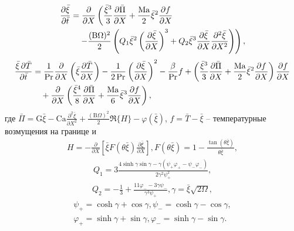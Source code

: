\documentclass[12pt,a4paper]{article}
\begin{document}
\begin{align} \label{eq:avrged_Ma_first_thermal}
	\frac{\partial \bar{\xi}}{\partial \bar{t}}
	&= \frac{\partial}{\partial X} \left(
	\frac{\bar{\xi}^3}{3} \frac{\partial \bar{\Pi}}{\partial X}
	+ \frac{\text{Ma}}{2} \bar{\xi}^2 \frac{\partial f}{\partial X} \right. \notag \\
	&\quad \left. - \frac{(\mathrm{B} \Omega)^2}{2} \left(
	Q_1 \bar{\xi}^2 \left( \frac{\partial \bar{\xi}}{\partial X} \right)^3
	+ Q_2 \bar{\xi}^3 \frac{\partial \bar{\xi}}{\partial X} \frac{\partial^2 \bar{\xi}}{\partial X^2}
	\right)
	\right),
\end{align}
\begin{align} \label{eq:avrged_Ma_second_thermal}
	\frac{\bar{\xi} \, \partial \bar{T}}{\partial \bar{t}}
	&= \frac{1}{\text{Pr}} \frac{\partial}{\partial X} \left( \bar{\xi} \frac{\partial \bar{T}}{\partial X} \right)
	- \frac{1}{2 \, \text{Pr}} \left( \frac{\partial \bar{\xi}}{\partial X} \right)^2
	- \frac{\beta}{\text{Pr}} f  + \left(
	\frac{\bar{\xi}^3}{3} \frac{\partial \bar{\Pi}}{\partial X}
	+ \frac{\text{Ma}}{2} \bar{\xi}^2 \frac{\partial f}{\partial X}
	\right) \frac{\partial f}{\partial X} \notag \\
	&\quad + \frac{\partial}{\partial X} \left(
	\frac{\bar{\xi}^4}{8} \frac{\partial \bar{\Pi}}{\partial X}
	+ \frac{\text{Ma}}{6} \bar{\xi}^3 \frac{\partial f}{\partial X}
	\right),
\end{align}
где $\bar{\Pi} = \mathrm{G} \bar{\xi} - \mathrm{Ca} \frac{\partial^2 \bar{\xi}}{\partial X^2} + \frac{(\mathrm{B} \Omega)^2}{2} \Re\{H\} - \varphi (\bar{\xi}) $, $f=\bar{T} - \bar{\xi}$ -- температурные возмущения на границе и
\begin{align*}
	H = - \frac{\partial}{\partial X} \left[ \bar{\xi} F(\theta \bar{\xi}) \frac{\partial \bar{\xi}}{\partial X} \right], F (\theta \bar{\xi}) = 1 - \frac{\tan(\theta \bar{\xi})}{\theta \bar{\xi}},
\end{align*}
\begin{align*}
	Q_1 = 3 \frac{4 \sinh \gamma \sin \gamma - \gamma (\psi_+ \varphi_+ - \psi_- \varphi_-)}{2 \gamma^2 \psi_+^2},
\end{align*}
\begin{align*}
	Q_2 = -\frac{1}{3} + \frac{11 \varphi_- - 3 \gamma \psi_-}{\gamma^3 \psi_+}, \gamma=\bar{\xi} \sqrt{2 \Omega},
\end{align*}
\begin{align*}
	\psi_+ = \cosh \gamma + \cos \gamma,
	\psi_- = \cosh \gamma - \cos \gamma, \\
	\varphi_+ = \sinh \gamma + \sin \gamma,
	\varphi_- = \sinh \gamma - \sin \gamma.
\end{align*}
\end{document}
